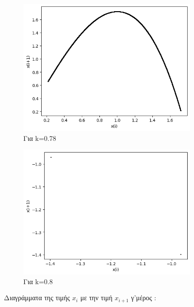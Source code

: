 \begin{figure}[h!]
\centering
	\begin{subfigure}[b]{0.4\textwidth}
		\centering
		\includegraphics[width=\textwidth]{LateX images/graphs q14/g25}
		\caption{Για k=0.78}
		\label{f:k81}
	\end{subfigure}
	\hfill
	\begin{subfigure}[b]{0.4\textwidth}
		\centering
		\includegraphics[width=\textwidth]{LateX images/graphs q14/g26}
		\caption{Για k=0.8}
		\label{f:k82}
	\end{subfigure}
	\hfill	
	\caption{Διαγράμματα της τιμής \(x_i\) με την τιμή \(x_{i+1}\) γ'μέρος :}	
\end{figure}


